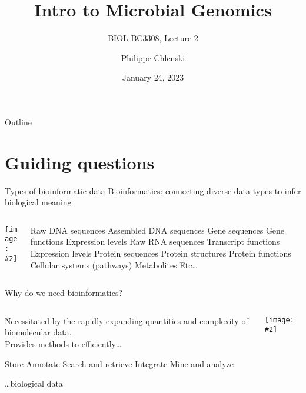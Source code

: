 \documentclass{beamer}
\title{Intro to Microbial Genomics}
\subtitle{BIOL BC3308, Lecture 2}
\author{Philippe Chlenski}
\date{January 24, 2023}
\renewcommand{\c}[1]{\begin{center}#1\end{center}}
\newcommand{\gr}[2][.95]{\c{\texttt{[image: \#2]}}}
\begin{document}
\begin{frame}[plain]
\titlepage
\end{frame}

\begin{frame}{Outline}
\tableofcontents
\end{frame}

\section{Guiding questions}

\begin{frame}{Types of bioinformatic data}
Bioinformatics: connecting diverse data types to infer biological meaning
\begin{columns}
\begin{column}{0.5\textwidth}
    \gr{l2_figs/s3_evolve.png}
\end{column}
\begin{column}{0.5\textwidth}
    \tiny
    \begin{outline}
        \1 Raw DNA sequences
        \1 Assembled DNA sequences
        \1 Gene sequences
        \1 Gene functions
        \1 Expression levels
        \1 Raw RNA sequences
        \1 Transcript functions
        \1 Expression levels
        \1 Protein sequences
        \1 Protein structures
        \1 Protein functions
        \1 Cellular systems (pathways)
        \1 Metabolites
        \1 Etc\ldots
    \end{outline}
\end{column}
\end{columns}
\end{frame}

\begin{frame}{Why do we need bioinformatics?}
\begin{columns}
\begin{column}{0.5\textwidth}
    Necessitated by the rapidly expanding quantities and complexity of biomolecular data.\\
    \bigskip
    Provides methods to efficiently\ldots
    \begin{outline}
        \1 Store
        \1 Annotate
        \1 Search and retrieve
        \1 Integrate
        \1 Mine and analyze
    \end{outline}
    \ldots biological data
\end{column}
\begin{column}{0.5\textwidth}
    \gr{l2_figs/s3_number_genomes.png}
\end{column}
\end{columns}
\end{frame}
\end{document}
